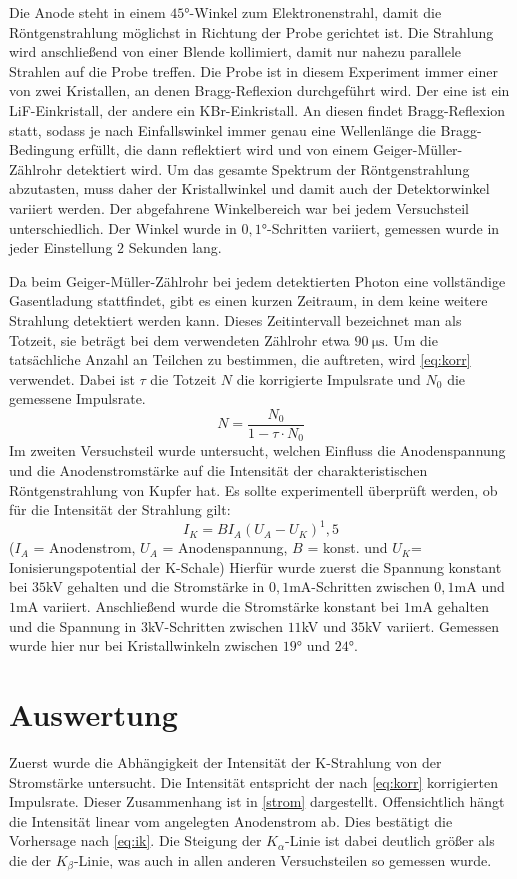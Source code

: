 \documentclass[
	a4paper,
	12pt,
	pagesize,
	ngerman
]{scrartcl}
\begin{document}
Die Anode steht in einem $45$°-Winkel zum Elektronenstrahl, damit die Röntgenstrahlung möglichst in Richtung der Probe gerichtet ist. Die Strahlung wird anschließend von einer Blende kollimiert, damit nur nahezu parallele Strahlen auf die Probe treffen. Die Probe ist in diesem Experiment immer einer von zwei Kristallen, an denen Bragg-Reflexion durchgeführt wird. Der eine ist ein LiF-Einkristall, der andere ein KBr-Einkristall. An diesen findet Bragg-Reflexion statt, sodass je nach Einfallswinkel immer genau eine Wellenlänge die Bragg-Bedingung erfüllt, die dann reflektiert wird und von einem Geiger-Müller-Zählrohr detektiert wird. Um das gesamte Spektrum der Röntgenstrahlung abzutasten, muss daher der Kristallwinkel und damit auch der Detektorwinkel variiert werden. Der abgefahrene Winkelbereich war bei jedem Versuchsteil unterschiedlich. Der Winkel wurde in $0,1$°-Schritten variiert, gemessen wurde in jeder Einstellung $2$ Sekunden lang.

Da beim Geiger-Müller-Zählrohr bei jedem detektierten Photon eine vollständige Gasentladung stattfindet, gibt es einen kurzen Zeitraum, in dem keine weitere Strahlung detektiert werden kann. Dieses Zeitintervall bezeichnet man als Totzeit, sie beträgt bei dem verwendeten Zählrohr etwa $\SI{90}{\micro \second}$. Um die tatsächliche Anzahl an Teilchen zu bestimmen, die auftreten, wird \cref{eq:korr} verwendet. Dabei ist $\tau$ die Totzeit $N$ die korrigierte Impulsrate und $N_0$ die gemessene Impulsrate.
\begin{equation}
	N = \frac{N_0}{1 - \tau \cdot N_0}
	\label{eq:korr}
\end{equation}
Im zweiten Versuchsteil wurde untersucht, welchen Einfluss die Anodenspannung und die Anodenstromstärke auf die Intensität der charakteristischen Röntgenstrahlung von Kupfer hat. Es sollte experimentell überprüft werden, ob für die Intensität der Strahlung gilt:
\begin{equation}
	I_K = B I_A (U_A - U_K)^1,5
	\label{eq:ik}
\end{equation}
($I_A$ = Anodenstrom, $U_A$ = Anodenspannung, $B$ = konst. und $U_K$= Ionisierungspotential der K-Schale)
Hierfür wurde zuerst die Spannung konstant bei $35$kV gehalten und die Stromstärke in $0,1$mA-Schritten zwischen $0,1$mA und $1$mA variiert. Anschließend wurde die Stromstärke konstant bei $1$mA gehalten und die Spannung in $3$kV-Schritten zwischen $11$kV und $35$kV variiert. Gemessen wurde hier nur bei Kristallwinkeln zwischen $19$° und $24$°.

\section{Auswertung}
Zuerst wurde die Abhängigkeit der Intensität der K-Strahlung von der Stromstärke untersucht. Die Intensität entspricht der nach \cref{eq:korr} korrigierten Impulsrate. Dieser Zusammenhang ist in \cref{strom} dargestellt. Offensichtlich hängt die Intensität linear vom angelegten Anodenstrom ab. Dies bestätigt die Vorhersage nach \cref{eq:ik}. Die Steigung der $K_\alpha$-Linie ist dabei deutlich größer als die der $K_\beta$-Linie, was auch in allen anderen Versuchsteilen so gemessen wurde.
\end{document}
